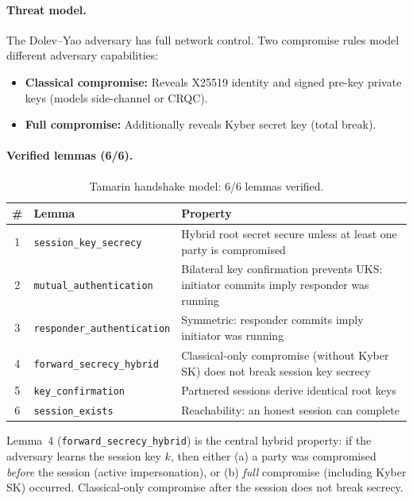 \documentclass[11pt,a4paper]{article}
\theoremstyle{definition}
\begin{document}
\paragraph{Threat model.}
The Dolev--Yao adversary has full network control. Two compromise rules model different adversary capabilities:
\begin{itemize}
  \item \textbf{Classical compromise:} Reveals X25519 identity and signed pre-key private keys (models side-channel or CRQC).
  \item \textbf{Full compromise:} Additionally reveals Kyber secret key (total break).
\end{itemize}

\paragraph{Verified lemmas (6/6).}

\begin{table}[H]
\centering
\caption{Tamarin handshake model: 6/6 lemmas verified.}\label{tab:tamarin-hs}
\small
\begin{tabularx}{\textwidth}{@{}clX@{}}
\toprule
\# & Lemma & Property \\
\midrule
1 & \texttt{session\_key\_secrecy} & Hybrid root secret secure unless at least one party is compromised \\
2 & \texttt{mutual\_authentication} & Bilateral key confirmation prevents UKS: initiator commits imply responder was running \\
3 & \texttt{responder\_authentication} & Symmetric: responder commits imply initiator was running \\
4 & \texttt{forward\_secrecy\_hybrid} & Classical-only compromise (without Kyber SK) does not break session key secrecy \\
5 & \texttt{key\_confirmation} & Partnered sessions derive identical root keys \\
6 & \texttt{session\_exists} & Reachability: an honest session can complete \\
\bottomrule
\end{tabularx}
\end{table}

Lemma~4 (\texttt{forward\_secrecy\_hybrid}) is the central hybrid property: if the adversary learns the session key $k$, then either (a) a party was compromised \emph{before} the session (active impersonation), or (b) \emph{full} compromise (including Kyber SK) occurred. Classical-only compromise after the session does not break secrecy.
\end{document}
